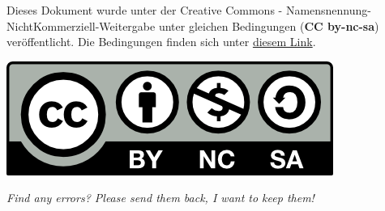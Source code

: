 \documentclass{article}
\begin{document}

\begin{shaded}
Dieses Dokument wurde unter der Creative Commons - Namensnennung-NichtKommerziell-Weitergabe unter gleichen Bedingungen (\textbf{CC by-nc-sa}) veröffentlicht. Die Bedingungen finden sich unter \href{http://creativecommons.org/licenses/by-nc-sa/3.0/de}{diesem Link}. \\
\centerline{\includegraphics[scale=1]{../cc-by-nc-sa.png} }
\end{shaded}

\textit{Find any errors? Please send them back, I want to keep them!}


\end{document}
